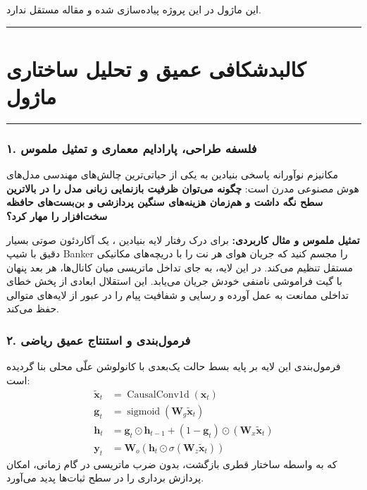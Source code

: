 \clearpage
{}
\vspace*{0.2cm}

این ماژول در این پروژه پیاده‌سازی شده و مقاله مستقل ندارد.
\noindent\rule{\textwidth}{1.2pt}
\vspace*{0.1cm}
\section{کالبدشکافی عمیق و تحلیل ساختاری ماژول }
\label{sec:mod_hgrn2_layer}
\vspace*{-0.2cm}
\noindent\rule{\textwidth}{0.5pt}
\vspace*{0.3cm}

\subsubsection*{۱. فلسفه طراحی، پارادایم معماری و تمثیل ملموس}
مکانیزم نوآورانه  پاسخی بنیادین به یکی از حیاتی‌ترین چالش‌های مهندسی مدل‌های هوش مصنوعی مدرن است: \textbf{چگونه می‌توان ظرفیت بازنمایی زبانی مدل را در بالاترین سطح نگه داشت و هم‌زمان هزینه‌های سنگین پردازشی و بن‌بست‌های حافظه سخت‌افزار را مهار کرد؟}

\textbf{تمثیل ملموس و مثال کاربردی:}
برای درک رفتار لایه بنیادین ، یک آکاردئون صوتی بسیار دقیق با شیپ Banker را مجسم کنید که جریان هوای هر نت را با دریچه‌های مکانیکی مستقل تنظیم می‌کند. در این لایه، به جای تداخل ماتریسی میان کانال‌ها، هر بعد پنهان با گیت فراموشی نامنفی خودش جریان می‌یابد. این استقلال ابعادی از پخش خطای تداخلی ممانعت به عمل آورده و رسایی و شفافیت پیام را در عبور از لایه‌های متوالی حفظ می‌کند.

\subsubsection*{۲. فرمول‌بندی و استنتاج عمیق ریاضی }
فرمول‌بندی این لایه بر پایه بسط حالت یک‌بعدی با کانولوشن علّی محلی بنا گردیده است:
\begin{align}
\tilde{\mathbf{x}}_t &= \operatorname{CausalConv1d}(\mathbf{x}_t) \\
\mathbf{g}_t &= \operatorname{sigmoid}(\mathbf{W}_g \tilde{\mathbf{x}}_t) \\
\mathbf{h}_t &= \mathbf{g}_t \odot \mathbf{h}_{t-1} + (1 - \mathbf{g}_t) \odot (\mathbf{W}_x \tilde{\mathbf{x}}_t) \\
\mathbf{y}_t &= \mathbf{W}_o (\mathbf{h}_t \odot \sigma(\mathbf{W}_z \tilde{\mathbf{x}}_t))
\end{align}
که به واسطه ساختار قطری بازگشت، بدون ضرب ماتریسی در گام زمانی، امکان پردازش برداری را در سطح ثبات‌ها پدید می‌آورد.

